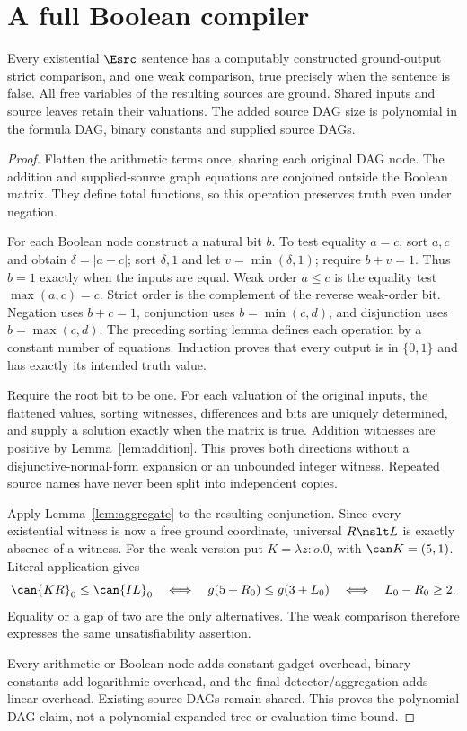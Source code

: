 \documentclass[11pt,a4paper]{article}
\begin{document}
\section{A full Boolean compiler}\label{sec:boolean}

\begin{theorem}\label{thm:compiler}
Every existential $\Esrc$ sentence has a computably constructed ground-output
strict comparison, and one weak comparison, true precisely when the sentence
is false.  All free variables of the resulting sources are ground.  Shared
inputs and source leaves retain their valuations.  The added source DAG size
is polynomial in the formula DAG, binary constants and supplied source DAGs.
\end{theorem}
\begin{proof}
Flatten the arithmetic terms once, sharing each original DAG node.  The
addition and supplied-source graph equations are conjoined outside the
Boolean matrix.  They define total functions, so this operation preserves
truth even under negation.

For each Boolean node construct a natural bit $b$.  To test equality $a=c$,
sort $a,c$ and obtain $\delta=|a-c|$; sort $\delta,1$ and let
$v=\min(\delta,1)$; require $b+v=1$.  Thus $b=1$ exactly when the inputs
are equal.  Weak order $a\le c$ is the equality test $\max(a,c)=c$.
Strict order is the complement of the reverse weak-order bit.  Negation
uses $b+c=1$, conjunction uses $b=\min(c,d)$, and disjunction uses
$b=\max(c,d)$.  The preceding sorting lemma defines each operation by a
constant number of equations.  Induction proves that every output is in
$\{0,1\}$ and has exactly its intended truth value.

Require the root bit to be one.  For each valuation of the original inputs,
the flattened values, sorting witnesses, differences and bits are uniquely
determined, and supply a solution exactly when the matrix is true.  Addition
witnesses are positive by Lemma~\ref{lem:addition}.  This proves both directions
without a disjunctive-normal-form expansion or an unbounded integer witness.
Repeated source names have never been split into independent copies.

Apply Lemma~\ref{lem:aggregate} to the resulting conjunction.  Since every
existential witness is now a free ground coordinate, universal $R\mslt L$
is exactly absence of a witness.  For the weak version put
$K=\lambda z:o.0$, with $\can K=(5,1)$.  Literal application gives
\[
 \can{KR}_0\le\can{IL}_0
 \quad\Longleftrightarrow\quad g(5+R_0)\le g(3+L_0)
 \quad\Longleftrightarrow\quad L_0-R_0\ge2.
\]
Equality or a gap of two are the only alternatives.  The weak comparison
therefore expresses the same unsatisfiability assertion.

Every arithmetic or Boolean node adds constant gadget overhead, binary
constants add logarithmic overhead, and the final detector/aggregation adds
linear overhead.  Existing source DAGs remain shared.  This proves the
polynomial DAG claim, not a polynomial expanded-tree or evaluation-time bound.
\end{proof}
\end{document}
